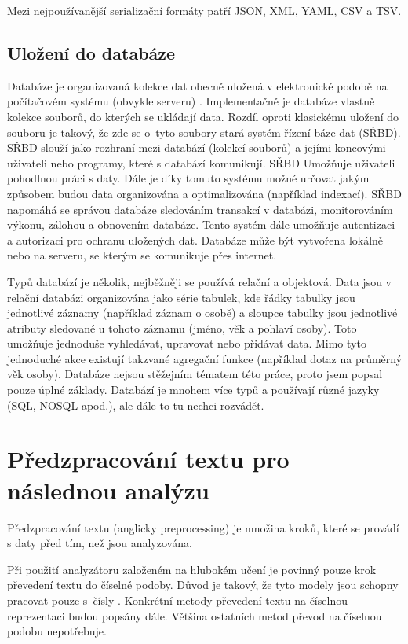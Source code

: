 Mezi nejpoužívanější serializační formáty patří JSON, XML, YAML, CSV a TSV.


\subsection{Uložení do databáze}
Databáze je organizovaná kolekce dat obecně uložená v elektronické podobě na počítačovém systému (obvykle serveru) \cite{oracle}. 
Implementačně je databáze vlastně kolekce souborů, do kterých se ukládají data. Rozdíl oproti klasickému uložení do souboru je takový, že zde se o~tyto soubory stará systém řízení báze dat (SŘBD). SŘBD slouží jako rozhraní mezi databází (kolekcí souborů) a jejími koncovými uživateli nebo programy, které s databází komunikují. SŘBD Umožňuje uživateli pohodlnou práci s daty. Dále je díky tomuto systému možné určovat jakým způsobem budou data organizována a optimalizována (například indexací). SŘBD napomáhá se správou databáze sledováním transakcí v databázi, monitorováním výkonu, zálohou a obnovením databáze. Tento systém dále umožňuje autentizaci a autorizaci pro ochranu uložených dat. Databáze může být vytvořena lokálně nebo na serveru, se kterým se komunikuje přes internet.

Typů databází je několik, nejběžněji se používá relační a objektová. Data jsou v relační databázi organizována jako série tabulek, kde řádky tabulky jsou jednotlivé záznamy (například záznam o osobě) a sloupce tabulky jsou jednotlivé atributy sledované u tohoto záznamu (jméno, věk a pohlaví osoby). Toto umožňuje jednoduše vyhledávat, upravovat nebo přidávat data. Mimo tyto jednoduché akce existují takzvané agregační funkce (například dotaz na průměrný věk osoby). 
Databáze nejsou stěžejním tématem této práce, proto jsem popsal pouze úplné základy. Databází je mnohem více typů a používají různé jazyky (SQL, NOSQL apod.), ale dále to tu nechci rozvádět.


\section{Předzpracování textu pro následnou analýzu}
\label{predzpracovani}
Předzpracování textu (anglicky preprocessing) je množina kroků, které se provádí s daty před tím, než jsou analyzována.

Při použití analyzátoru založeném na hlubokém učení je povinný pouze krok převedení textu do číselné podoby. Důvod je takový, že tyto modely jsou schopny pracovat pouze s~čísly \cite{mlexplained}. Konkrétní metody převedení textu na číselnou reprezentaci budou popsány dále. Většina ostatních metod převod na číselnou podobu nepotřebuje. 

